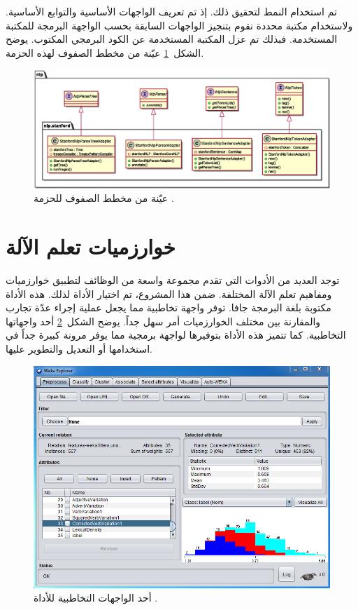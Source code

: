 تم استخدام النمط  لتحقيق ذلك.
إذ تم تعريف الواجهات الأساسية والتوابع الأساسية.
ولاستخدام مكتبة محددة نقوم بتنجيز الواجهات السابقة بحسب الواجهة البرمجة  للمكتبة المستخدمة.
فبذلك تم عزل المكتبة المستخدمة عن الكود البرمجي المكتوب.
يوضح الشكل~\ref{fig:cd:nlp} عيّنة من مخطط الصفوف لهذه الحزمة.

\begin{figure}[htb]
	\centering
	\includegraphics[width=1\linewidth]{images/cd-nlp.eps}
	\caption{%
		عيّنة من مخطط الصفوف للحزمة .
	}
	\label{fig:cd:nlp}
\end{figure}

\afterpage{\clearpage}



\section{خوارزميات تعلم الآلة}
توجد العديد من الأدوات  التي تقدم مجموعة واسعة من الوظائف لتطبيق خوارزميات ومفاهيم تعلم الآلة المختلفة.
ضمن هذا المشروع، تم اختيار الأداة
لذلك.
هذه الأداة مكتوبة بلغة البرمجة جافا.
توفر واجهة تخاطبية  مما يجعل عملية إجراء عدّة تجارب والمقارنة بين مختلف الخوارزميات أمر سهل جداً.
يوضح الشكل~\ref{fig:weka:gui} أحد واجهاتها التخاطبية.
كما تتميز هذه الأداة بتوفيرها لواجهة برمجية  مما يوفر مرونة كبيرة جداً في استخدامها أو التعديل والتطوير عليها.

\begin{figure}[htb]
	\centering
	\includegraphics[width=0.8\linewidth]{images/weka.png}
	\caption{%
		أحد الواجهات التخاطبية للأداة .
	}
	\label{fig:weka:gui}
\end{figure}




